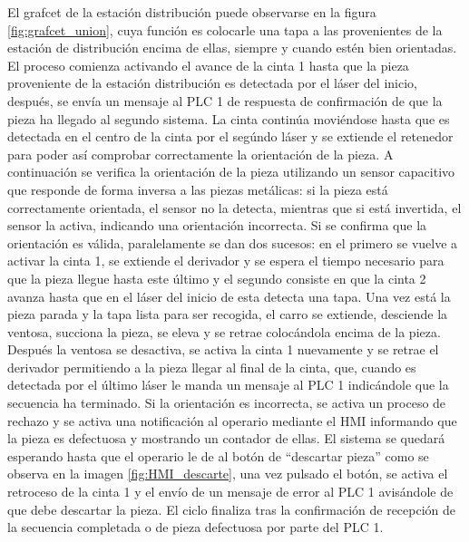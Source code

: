 El grafcet de la estación distribución puede observarse en la figura \ref{fig:grafcet_union}, cuya función es colocarle una tapa a las provenientes de la estación de distribución encima de ellas, siempre y cuando estén bien orientadas.  El proceso comienza activando el avance de la cinta 1 hasta que la pieza proveniente de la estación distribución es detectada por el láser del inicio, después, se envía un mensaje al PLC 1 de respuesta de confirmación de que la pieza ha llegado al segundo sistema. La cinta continúa moviéndose hasta que es detectada en el centro de la cinta por el segúndo láser y se extiende el retenedor para poder así comprobar correctamente la orientación de la pieza. A continuación se verifica la orientación de la pieza utilizando un sensor capacitivo que responde de forma inversa a las piezas metálicas: si la pieza está correctamente orientada, el sensor no la detecta, mientras que si está invertida, el sensor la activa, indicando una orientación incorrecta. Si se confirma que la orientación es válida, paralelamente se dan dos sucesos: en el primero se vuelve a activar la cinta 1, se extiende el derivador y se espera el tiempo necesario para que la pieza llegue hasta este último y el segundo consiste en que la cinta 2 avanza hasta que en el láser del inicio de esta detecta una tapa. Una vez está la pieza parada y la tapa lista para ser recogida, el carro se extiende, desciende la ventosa, succiona la pieza, se eleva y se retrae colocándola encima de la pieza. Después la ventosa se desactiva, se activa la cinta 1 nuevamente y se retrae el derivador permitiendo a la pieza llegar al final de la cinta, que, cuando es detectada por el último láser le manda un mensaje al PLC 1 indicándole que la secuencia ha terminado. Si la orientación es incorrecta, se activa un proceso de rechazo y se activa una notificación al operario mediante el HMI informando que la pieza es defectuosa y mostrando un contador de ellas. El sistema se quedará esperando hasta que el operario le de al botón de ``descartar pieza'' como se observa en la imagen  \ref{fig:HMI_descarte}, una vez pulsado el botón, se activa el retroceso de la cinta 1 y el envío de un mensaje de error al PLC 1 avisándole de que debe descartar la pieza. El ciclo finaliza tras la confirmación de recepción de la secuencia completada o de pieza defectuosa por parte del PLC 1. \\

